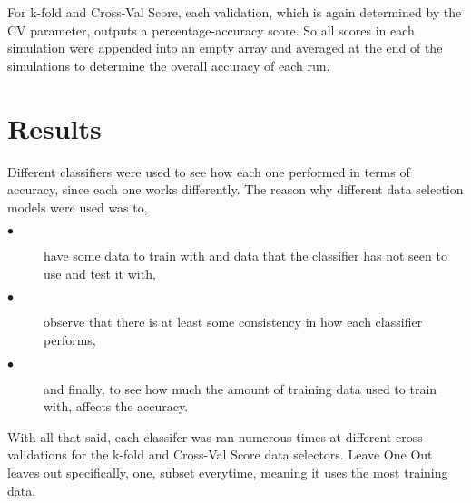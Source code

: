 \documentclass[conference,compsoc]{IEEEtran}
\begin{document}
For k-fold and Cross-Val Score, each validation, which is again determined by the CV parameter, outputs a percentage-accuracy score. So all scores in each simulation were appended into an empty array and averaged at the end of the simulations to determine the overall accuracy of each run.

\section{Results}
Different classifiers were used to see how each one performed in terms of accuracy, since each one works differently. The reason why different data selection models 
were used was to,
\begin{description}
	\item[$\bullet$] have some data to train with and data that the classifier has not seen to use and test it with,
	\item[$\bullet$] observe that there is at least some consistency in how each classifier performs,
	\item[$\bullet$] and finally, to see how much the amount of training data used to train with, affects the accuracy.
\end{description}
\noindent With all that said, each classifer was ran numerous times at different cross validations for the k-fold and Cross-Val Score data selectors. Leave One Out leaves out 
specifically, one, subset everytime, meaning it uses the most training data.
\end{document}
